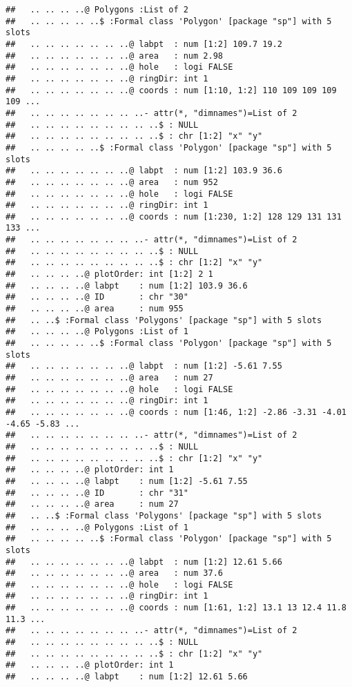 \documentclass[]{article}
\begin{document}
\begin{verbatim}
##   .. .. .. ..@ Polygons :List of 2
##   .. .. .. .. ..$ :Formal class 'Polygon' [package "sp"] with 5 slots
##   .. .. .. .. .. .. ..@ labpt  : num [1:2] 109.7 19.2
##   .. .. .. .. .. .. ..@ area   : num 2.98
##   .. .. .. .. .. .. ..@ hole   : logi FALSE
##   .. .. .. .. .. .. ..@ ringDir: int 1
##   .. .. .. .. .. .. ..@ coords : num [1:10, 1:2] 110 109 109 109 109 ...
##   .. .. .. .. .. .. .. ..- attr(*, "dimnames")=List of 2
##   .. .. .. .. .. .. .. .. ..$ : NULL
##   .. .. .. .. .. .. .. .. ..$ : chr [1:2] "x" "y"
##   .. .. .. .. ..$ :Formal class 'Polygon' [package "sp"] with 5 slots
##   .. .. .. .. .. .. ..@ labpt  : num [1:2] 103.9 36.6
##   .. .. .. .. .. .. ..@ area   : num 952
##   .. .. .. .. .. .. ..@ hole   : logi FALSE
##   .. .. .. .. .. .. ..@ ringDir: int 1
##   .. .. .. .. .. .. ..@ coords : num [1:230, 1:2] 128 129 131 131 133 ...
##   .. .. .. .. .. .. .. ..- attr(*, "dimnames")=List of 2
##   .. .. .. .. .. .. .. .. ..$ : NULL
##   .. .. .. .. .. .. .. .. ..$ : chr [1:2] "x" "y"
##   .. .. .. ..@ plotOrder: int [1:2] 2 1
##   .. .. .. ..@ labpt    : num [1:2] 103.9 36.6
##   .. .. .. ..@ ID       : chr "30"
##   .. .. .. ..@ area     : num 955
##   .. ..$ :Formal class 'Polygons' [package "sp"] with 5 slots
##   .. .. .. ..@ Polygons :List of 1
##   .. .. .. .. ..$ :Formal class 'Polygon' [package "sp"] with 5 slots
##   .. .. .. .. .. .. ..@ labpt  : num [1:2] -5.61 7.55
##   .. .. .. .. .. .. ..@ area   : num 27
##   .. .. .. .. .. .. ..@ hole   : logi FALSE
##   .. .. .. .. .. .. ..@ ringDir: int 1
##   .. .. .. .. .. .. ..@ coords : num [1:46, 1:2] -2.86 -3.31 -4.01 -4.65 -5.83 ...
##   .. .. .. .. .. .. .. ..- attr(*, "dimnames")=List of 2
##   .. .. .. .. .. .. .. .. ..$ : NULL
##   .. .. .. .. .. .. .. .. ..$ : chr [1:2] "x" "y"
##   .. .. .. ..@ plotOrder: int 1
##   .. .. .. ..@ labpt    : num [1:2] -5.61 7.55
##   .. .. .. ..@ ID       : chr "31"
##   .. .. .. ..@ area     : num 27
##   .. ..$ :Formal class 'Polygons' [package "sp"] with 5 slots
##   .. .. .. ..@ Polygons :List of 1
##   .. .. .. .. ..$ :Formal class 'Polygon' [package "sp"] with 5 slots
##   .. .. .. .. .. .. ..@ labpt  : num [1:2] 12.61 5.66
##   .. .. .. .. .. .. ..@ area   : num 37.6
##   .. .. .. .. .. .. ..@ hole   : logi FALSE
##   .. .. .. .. .. .. ..@ ringDir: int 1
##   .. .. .. .. .. .. ..@ coords : num [1:61, 1:2] 13.1 13 12.4 11.8 11.3 ...
##   .. .. .. .. .. .. .. ..- attr(*, "dimnames")=List of 2
##   .. .. .. .. .. .. .. .. ..$ : NULL
##   .. .. .. .. .. .. .. .. ..$ : chr [1:2] "x" "y"
##   .. .. .. ..@ plotOrder: int 1
##   .. .. .. ..@ labpt    : num [1:2] 12.61 5.66

\end{verbatim}
\end{document}
